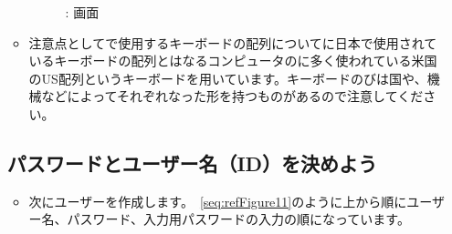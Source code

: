 \documentclass[a4paper,12pt]{jarticle}
\begin{document}
\begin{enumerate}
\begin{itemize}
\begin{figure}[h]
\begin{minipage}{0.45\textwidth}
{                    {\theFigure\label{seq:refFigure10}}:
                    画面}
                \end{minipage}
              \end{figure}   
              \item   注意点としてで使用するキーボードの配列についてに日本で使用されているキーボードの配列とはなるコンピュータのに多く使われている米国のUS配列というキーボードを用いています。キーボードのびは国や、機械などによってそれぞれなった形を持つものがあるので注意してください。 
        \end{itemize}   
        \clearpage 

  \subsection{\theExercise パスワードとユーザー名（ID）を決めよう}         
          
                \begin{itemize}
                \item                                      
                次にユーザーを作成します。~\ref{seq:refFigure11}のように上から順にユーザー名、パスワード、入力用パスワードの入力の順になっています。
              

\end{itemize}
\end{enumerate}
\end{document}
